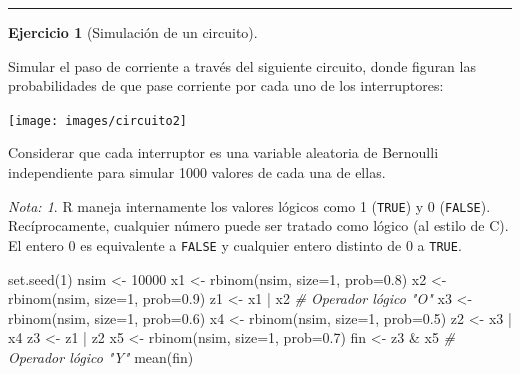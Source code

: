 \documentclass[
]{book}
\newenvironment{Shaded}{\begin{snugshade}}{\end{snugshade}}
\newcommand{\AttributeTok}[1]{\textcolor[rgb]{0.77,0.63,0.00}{#1}}
\newcommand{\CommentTok}[1]{\textcolor[rgb]{0.56,0.35,0.01}{\textit{#1}}}
\newcommand{\DecValTok}[1]{\textcolor[rgb]{0.00,0.00,0.81}{#1}}
\newcommand{\FloatTok}[1]{\textcolor[rgb]{0.00,0.00,0.81}{#1}}
\newcommand{\FunctionTok}[1]{\textcolor[rgb]{0.00,0.00,0.00}{#1}}
\newcommand{\NormalTok}[1]{#1}
\newcommand{\OtherTok}[1]{\textcolor[rgb]{0.56,0.35,0.01}{#1}}
\newcommand{\SpecialCharTok}[1]{\textcolor[rgb]{0.00,0.00,0.00}{#1}}
\theoremstyle{break}
\theoremstyle{definition}
\theoremstyle{definition}
\theoremstyle{definition}
\newtheorem{exercise}{Ejercicio}[chapter]
\theoremstyle{definition}
\theoremstyle{remark}
\newtheorem*{remark}{Nota: }
\begin{document}
\begin{center}\rule{0.5\linewidth}{0.5pt}\end{center}

\begin{exercise}[Simulación de un circuito]
\protect\hypertarget{exr:circuito}{}{\label{exr:circuito} {} }
\end{exercise}
Simular el paso de corriente a través del siguiente circuito, donde
figuran las probabilidades de que pase corriente por cada uno de los
interruptores:

\begin{center}\texttt{[image: images/circuito2]} \end{center}

Considerar que cada interruptor es una variable aleatoria de Bernoulli independiente
para simular 1000 valores de cada una de ellas.

\begin{remark}
{}R maneja internamente los valores lógicos como 1 (\texttt{TRUE}) y 0 (\texttt{FALSE}).
Recíprocamente, cualquier número puede ser tratado como lógico (al estilo de C).
El entero 0 es equivalente a \texttt{FALSE} y cualquier entero distinto de 0 a \texttt{TRUE}.
\end{remark}

\begin{Shaded}
\begin{Highlighting}[]
\FunctionTok{set.seed}\NormalTok{(}\DecValTok{1}\NormalTok{)}
\NormalTok{nsim }\OtherTok{\textless{}{-}} \DecValTok{10000}
\NormalTok{x1 }\OtherTok{\textless{}{-}} \FunctionTok{rbinom}\NormalTok{(nsim, }\AttributeTok{size=}\DecValTok{1}\NormalTok{, }\AttributeTok{prob=}\FloatTok{0.8}\NormalTok{)}
\NormalTok{x2 }\OtherTok{\textless{}{-}} \FunctionTok{rbinom}\NormalTok{(nsim, }\AttributeTok{size=}\DecValTok{1}\NormalTok{, }\AttributeTok{prob=}\FloatTok{0.9}\NormalTok{)}
\NormalTok{z1 }\OtherTok{\textless{}{-}}\NormalTok{ x1 }\SpecialCharTok{|}\NormalTok{ x2   }\CommentTok{\# Operador lógico "O"}
\NormalTok{x3 }\OtherTok{\textless{}{-}} \FunctionTok{rbinom}\NormalTok{(nsim, }\AttributeTok{size=}\DecValTok{1}\NormalTok{, }\AttributeTok{prob=}\FloatTok{0.6}\NormalTok{)}
\NormalTok{x4 }\OtherTok{\textless{}{-}} \FunctionTok{rbinom}\NormalTok{(nsim, }\AttributeTok{size=}\DecValTok{1}\NormalTok{, }\AttributeTok{prob=}\FloatTok{0.5}\NormalTok{)}
\NormalTok{z2 }\OtherTok{\textless{}{-}}\NormalTok{ x3 }\SpecialCharTok{|}\NormalTok{ x4}
\NormalTok{z3 }\OtherTok{\textless{}{-}}\NormalTok{ z1 }\SpecialCharTok{|}\NormalTok{ z2}
\NormalTok{x5 }\OtherTok{\textless{}{-}} \FunctionTok{rbinom}\NormalTok{(nsim, }\AttributeTok{size=}\DecValTok{1}\NormalTok{, }\AttributeTok{prob=}\FloatTok{0.7}\NormalTok{)}
\NormalTok{fin }\OtherTok{\textless{}{-}}\NormalTok{ z3 }\SpecialCharTok{\&}\NormalTok{ x5  }\CommentTok{\# Operador lógico "Y"}
\FunctionTok{mean}\NormalTok{(fin)}
\end{Highlighting}
\end{Shaded}
\end{document}
